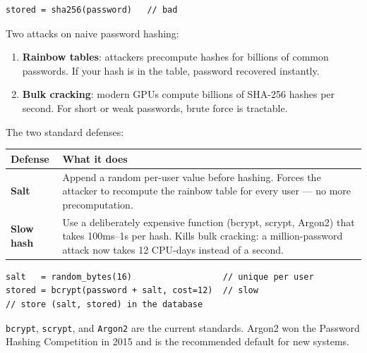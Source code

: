 \documentclass[11pt]{article}
\begin{document}
\begin{examplebox}
\begin{lstlisting}[basicstyle=\ttfamily\small,frame=single]
stored = sha256(password)   // bad
\end{lstlisting}
\end{examplebox}

Two attacks on naive password hashing:

\begin{enumerate}[leftmargin=*]
    \item \textbf{Rainbow tables}: attackers precompute hashes
          for billions of common passwords. If your hash is in
          the table, password recovered instantly.
    \item \textbf{Bulk cracking}: modern GPUs compute billions of
          SHA-256 hashes per second. For short or weak passwords,
          brute force is tractable.
\end{enumerate}

The two standard defenses:

\begin{center}
\begin{tabular}{|l|p{9cm}|}
\hline
\textbf{Defense} & \textbf{What it does} \\
\hline
\textbf{Salt} & Append a random per-user value before hashing. Forces the attacker to recompute the rainbow table for every user --- no more precomputation. \\
\textbf{Slow hash} & Use a deliberately expensive function (bcrypt, scrypt, Argon2) that takes 100ms--1s per hash. Kills bulk cracking: a million-password attack now takes 12 CPU-days instead of a second. \\
\hline
\end{tabular}
\end{center}

\begin{examplebox}
\begin{lstlisting}[basicstyle=\ttfamily\small,frame=single]
salt   = random_bytes(16)                  // unique per user
stored = bcrypt(password + salt, cost=12)  // slow
// store (salt, stored) in the database
\end{lstlisting}
\end{examplebox}

\texttt{bcrypt}, \texttt{scrypt}, and \texttt{Argon2} are the
current standards. Argon2 won the Password Hashing Competition
in 2015 and is the recommended default for new systems.
\end{document}
